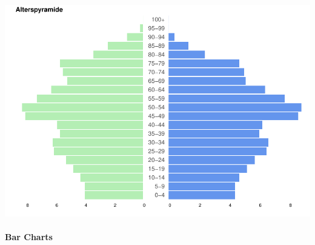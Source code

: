 \documentclass[
]{article}
\let\oldparagraph\paragraph
\renewcommand{\paragraph}[1]{\oldparagraph{#1}\mbox{}}
\begin{document}
\includegraphics{ggplot2_files/figure-latex/unnamed-chunk-7-1.pdf}

\hypertarget{bar-charts}{%
\paragraph{Bar Charts}\label{bar-charts}}
\end{document}
